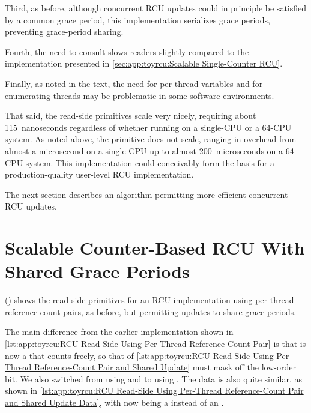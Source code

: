 Third, as before, although concurrent RCU updates could in principle
be satisfied by a common grace period, this implementation serializes
grace periods, preventing grace-period sharing.

Fourth, the need to consult  slows readers slightly compared
to the implementation presented in
\cref{sec:app:toyrcu:Scalable Single-Counter RCU}.

Finally, as noted in the text, the need for per-thread variables
and for enumerating threads may be problematic in some software
environments.

That said, the read-side primitives scale very nicely, requiring about
115~nanoseconds regardless of whether running on a single-CPU or a 64-CPU
 system.
As noted above, the  primitive does not scale,
ranging in overhead from almost a microsecond on a single  CPU
up to almost 200~microseconds on a 64-CPU system.
This implementation could conceivably form the basis for a
production-quality user-level RCU implementation.

The next section describes an algorithm permitting more efficient
concurrent RCU updates.

\section{Scalable Counter-Based RCU With Shared Grace Periods}
\label{sec:app:toyrcu:Scalable Counter-Based RCU With Shared Grace Periods}

()
shows the read-side primitives for an RCU implementation using per-thread
reference count pairs, as before, but permitting updates to share
grace periods.
\begin{fcvref}
The main difference from the earlier implementation shown in
\cref{lst:app:toyrcu:RCU Read-Side Using Per-Thread Reference-Count Pair}
is that  is now a  that counts freely,
so that  of
\cref{lst:app:toyrcu:RCU Read-Side Using Per-Thread Reference-Count Pair and Shared Update}
must mask off the low-order bit.
We also switched from using  and 
to using .
The data is also quite similar, as shown in
\cref{lst:app:toyrcu:RCU Read-Side Using Per-Thread Reference-Count Pair and Shared Update Data},
with  now being a  instead of an
.
\end{fcvref}

